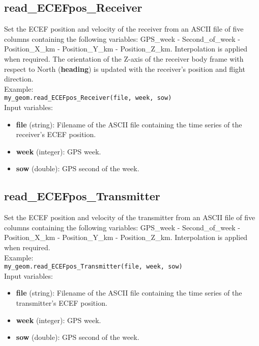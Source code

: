 \subsection{read\_ECEFpos\_Receiver}

Set the ECEF position and velocity of the receiver from an ASCII file of five columns containing the following variables: GPS\_week - Second\_of\_week - Position\_X\_km - Position\_Y\_km - Position\_Z\_km. Interpolation is applied when required. The orientation of the Z-axis of the receiver body frame with respect to North ({\bf heading}) is updated with the receiver's position and flight direction.\\

Example:\\

\texttt{my\_geom.read\_ECEFpos\_Receiver(file, week, sow)}\\

Input variables:
\begin{itemize}
\item {\bf file} (string): Filename of the ASCII file containing the time series of the receiver's ECEF position.
\item {\bf week} (integer): GPS week.
\item {\bf sow} (double): GPS second of the week.
\end{itemize}


\subsection{read\_ECEFpos\_Transmitter}

Set the ECEF position and velocity of the transmitter from an ASCII file of five columns containing the following variables: GPS\_week - Second\_of\_week - Position\_X\_km - Position\_Y\_km - Position\_Z\_km. Interpolation is applied when required.\\

Example:\\

\texttt{my\_geom.read\_ECEFpos\_Transmitter(file, week, sow)}\\

Input variables:
\begin{itemize}
\item {\bf file} (string): Filename of the ASCII file containing the time series of the transmitter's ECEF position.
\item {\bf week} (integer): GPS week.
\item {\bf sow} (double): GPS second of the week.
\end{itemize}


